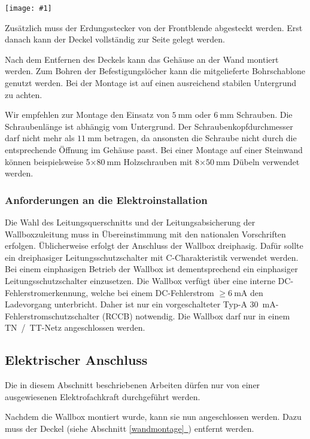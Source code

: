\documentclass[a4paper,10pt]{article}
\newcommand{\hint}[1]{\begin{tcolorbox}[colback=boxgray,colframe=black,coltext=
white,title=Hinweis,left*=2mm,right*=2mm,boxsep=1mm,bottom=1mm,top=1mm]#1\end{tcolorbox}}
\newcommand{\gfx}[1]{\texttt{[image: \#1]}}
\newcommand*{\fullref}[1]{Abschnitt \hyperref[{#1}]{\ref*{#1}~\nameref*{#1}}}
\begin{document}
\begin{multicols*}{2}
    \gfx{./img_warp3/resized/warp3_frontLEDcable.jpg}

    Zusätzlich muss der Erdungsstecker von der Front\-blende abgesteckt werden.
    Erst danach kann der Deckel vollständig zur Seite gelegt werden.

    Nach dem Entfernen des Deckels kann das Gehäuse an der Wand montiert werden. Zum
    Bohren der Befestigungslöcher kann die mitgelieferte Bohrschablone genutzt
    werden. Bei der Montage ist auf einen ausreichend stabilen Untergrund zu
    achten.

    Wir empfehlen zur Montage den Einsatz von $\SI{5}{\milli\meter}$ oder
    $\SI{6}{\milli\meter}$ Schrauben. Die Schraubenlänge ist abhängig vom
    Untergrund. Der Schraubenkopfdurchmesser darf nicht mehr als
    $\SI{11}{\milli\meter}$ betragen, da ansonsten die Schraube nicht durch die
    entsprechende Öffnung im Gehäuse passt. Bei einer Montage auf einer Steinwand
    können beispielsweise 5$\times\SI{80}{\milli\meter}$ Holzschrauben
    mit 8$\times\SI{50}{\milli\meter}$ Dübeln verwendet werden.

    \subsubsection{Anforderungen an die Elektroinstallation}
    Die Wahl des Leitungsquerschnitts und der Lei\-tungs\-ab\-sicher\-ung der
    Wallboxzuleitung muss in Übereinstimmung mit den nationalen Vorschriften
    erfolgen. Üblicherweise erfolgt der Anschluss der Wallbox dreiphasig.
    Dafür sollte ein dreiphasiger Leitungsschutzschalter mit C-Charakteristik
    verwendet werden. Bei einem einphasigen Betrieb der Wallbox ist
    dementsprechend ein einphasiger Leitungsschutzschalter einzusetzen.
    Die Wallbox verfügt über eine interne DC-Fehlerstromerkennung, welche
    bei einem DC-Fehlerstrom $\geq \SI{6}{\milli\ampere}$ den Ladevorgang
    unterbricht. Daher ist nur ein vorgeschalteter Typ-A \SI{30}{\milli\ampere}-Fehlerstromschutzschalter (RCCB)
    notwendig.
    Die Wallbox darf nur in einem TN~/~TT-Netz angeschlossen werden.

    \newpage
    \subsection{Elektrischer Anschluss}
    \hint{Die in diesem Abschnitt beschriebenen Arbeiten dürfen nur von einer ausgewiesenen
        Elektrofachkraft durchgeführt werden.}

    Nachdem die Wallbox montiert wurde, kann sie nun angeschlossen werden. Dazu
    muss der Deckel (siehe \fullref{wandmontage}) entfernt werden.


\end{multicols*}
\end{document}
